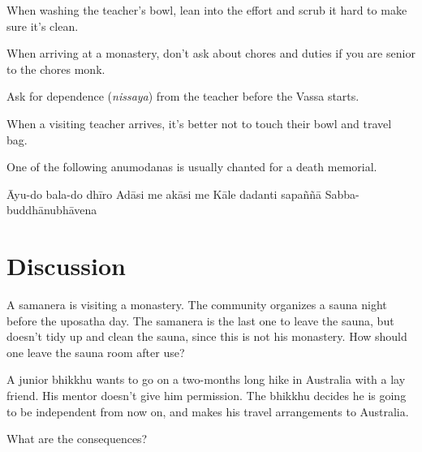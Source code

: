 \begin{exam}{\autoExamName}
\begin{problem*}
\begin{parts}
  \item {} When washing the teacher's bowl, lean into the effort and scrub
    it hard to make sure it's clean.

  \item {} When arriving at a monastery, don't ask about chores and duties
    if you are senior to the chores monk.

  \item {} Ask for dependence (\textit{nissaya}) from the teacher before the
    Vassa starts.

  \item {} When a visiting teacher arrives, it's better not to touch their
    bowl and travel bag.

\end{parts}

\end{problem*}

\clearpage

\begin{problem}

\item One of the following anumodanas is usually chanted for a death memorial.

  \bigskip

  \begin{answers}{1}
    \bChoices
     Āyu-do bala-do dhīro\eAns
     Adāsi me akāsi me\eAns
     Kāle dadanti sapaññā\eAns
     Sabba-buddhānubhāvena\eAns
    \eChoices
  \end{answers}

\end{problem}

\end{exam}

\section*{Discussion}

A samanera is visiting a monastery. The community organizes a sauna night before
the uposatha day. The samanera is the last one to leave the sauna, but doesn't
tidy up and clean the sauna, since this is not his monastery.
How should one leave the sauna room after use?

\bigskip

A junior bhikkhu wants to go on a two-months long hike in Australia with a lay
friend. His mentor doesn't give him permission. The bhikkhu decides he is going
to be independent from now on, and makes his travel arrangements to Australia.

What are the consequences?

